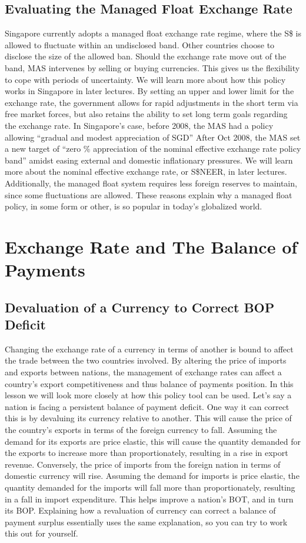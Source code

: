 \documentclass[DIV=classic,11pt,numbers=noenddot,listof=totoc,bibliography=totoc,parskip]{scrartcl}
\begin{document}
\subsection{Evaluating the Managed Float Exchange Rate}
Singapore currently adopts a managed float exchange rate regime, where the S\$ is allowed to fluctuate within an undisclosed band. Other countries choose to disclose the size of the allowed ban. Should the exchange rate move out of the band, MAS intervenes by selling or buying currencies. This gives us the flexibility to cope with periods of uncertainty. We will learn more about how this policy works in Singapore in later lectures. By setting an upper and lower limit for the exchange rate, the government allows for rapid adjustments in the short term via free market forces, but also retains the ability to set long term goals regarding the exchange rate. In Singapore’s case, before 2008, the MAS had a policy allowing “gradual and modest appreciation of SGD” After Oct 2008, the MAS set a new target of “zero \% appreciation of the nominal effective exchange rate policy band” amidst easing external and domestic inflationary pressures. We will learn more about the nominal effective exchange rate, or S\$NEER, in later lectures. Additionally, the managed float system requires less foreign reserves to maintain, since some fluctuations are allowed. These reasons explain why a managed float policy, in some form or other, is so popular in today’s globalized world.
\newpage
\section{Exchange Rate and The Balance of Payments}
\subsection{Devaluation of a Currency to Correct BOP Deficit}
Changing the exchange rate of a currency in terms of another is bound to affect the trade between the two countries involved. By altering the price of imports and exports between nations, the management of exchange rates can affect a country’s export competitiveness and thus balance of payments position. In this lesson we will look more closely at how this policy tool can be used. Let’s say a nation is facing a persistent balance of payment deficit. One way it can correct this is by devaluing its currency relative to another. This will cause the price of the country’s exports in terms of the foreign currency to fall. Assuming the demand for its exports are price elastic, this will cause the quantity demanded for the exports to increase more than proportionately, resulting in a rise in export revenue. Conversely, the price of imports from the foreign nation in terms of domestic currency will rise. Assuming the demand for imports is price elastic, the quantity demanded for the imports will fall more than proportionately, resulting in a fall in import expenditure. This helps improve a nation’s BOT, and in turn its BOP. Explaining how a revaluation of currency can correct a balance of payment surplus essentially uses the same explanation, so you can try to work this out for yourself.
\end{document}
